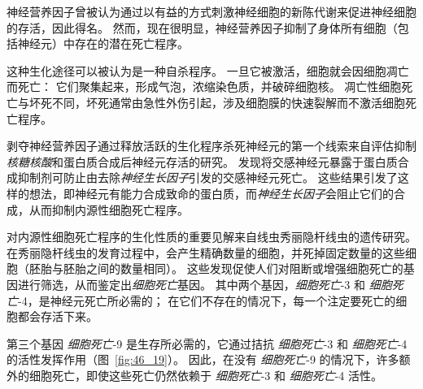 神经营养因子曾被认为通过以有益的方式刺激神经细胞的新陈代谢来促进神经细胞的存活，因此得名。
然而，现在很明显，神经营养因子抑制了身体所有细胞（包括神经元）中存在的潜在死亡程序。


这种生化途径可以被认为是一种自杀程序。
一旦它被激活，细胞就会因细胞凋亡而死亡：
它们聚集起来，形成气泡，浓缩染色质，并破碎细胞核。
凋亡性细胞死亡与坏死不同，坏死通常由急性外伤引起，涉及细胞膜的快速裂解而不激活细胞死亡程序。


剥夺神经营养因子通过释放活跃的生化程序杀死神经元的第一个线索来自评估抑制\textit{核糖核酸}和蛋白质合成后神经元存活的研究。
发现将交感神经元暴露于蛋白质合成抑制剂可防止由去除\textit{神经生长因子}引发的交感神经元死亡。
这些结果引发了这样的想法，即神经元有能力合成致命的蛋白质，而\textit{神经生长因子}会阻止它们的合成，从而抑制内源性细胞死亡程序。


对内源性细胞死亡程序的生化性质的重要见解来自线虫秀丽隐杆线虫的遗传研究。
在秀丽隐杆线虫的发育过程中，会产生精确数量的细胞，并死掉固定数量的这些细胞（胚胎与胚胎之间的数量相同）。
这些发现促使人们对阻断或增强细胞死亡的基因进行筛选，从而鉴定出\textit{细胞死亡}基因。
其中两个基因，\textit{细胞死亡}-3 和 \textit{细胞死亡}-4，是神经元死亡所必需的；
在它们不存在的情况下，每一个注定要死亡的细胞都会存活下来。

第三个基因 \textit{细胞死亡}-9 是生存所必需的，它通过拮抗 \textit{细胞死亡}-3 和 \textit{细胞死亡}-4 的活性发挥作用（图~\ref{fig:46_19}）。
因此，在没有 \textit{细胞死亡}-9 的情况下，许多额外的细胞死亡，即使这些死亡仍然依赖于 \textit{细胞死亡}-3 和 \textit{细胞死亡}-4 活性。



